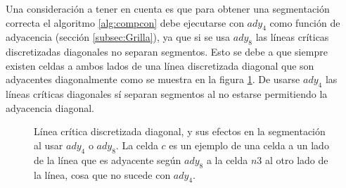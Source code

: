 Una consideración a tener en cuenta es que para obtener una segmentación
correcta el algoritmo \ref{alg:compcon} debe ejecutarse con $ady_4$ como
función de adyacencia (sección \ref{subsec:Grilla}), ya que si se usa $ady_8$
las líneas críticas discretizadas diagonales no separan segmentos. Esto se debe
a que siempre existen celdas a ambos lados de una línea discretizada diagonal que son
adyacentes diagonalmente como se muestra en la figura \ref{fig:probDiagSeg}. De
usarse $ady_4$ las líneas críticas diagonales sí separan segmentos al no estarse
permitiendo la adyacencia diagonal.

\begin{figure}[H]
  \centerfloat


  \qquad

  \caption[Línea crítica discretizada diagonal, y sus efectos en la
  segmentacion al usar $ady_4$ o $ady_8$.]{Línea crítica discretizada diagonal, y sus efectos en la
  segmentación al usar $ady_4$ o $ady_8$. La celda $c$ es un ejemplo de
una celda a un lado de la línea que es adyacente según $ady_8$ a la celda $n3$ al 
otro lado de la línea, cosa que no sucede con $ady_4$.}\label{fig:probDiagSeg}

\end{figure}

